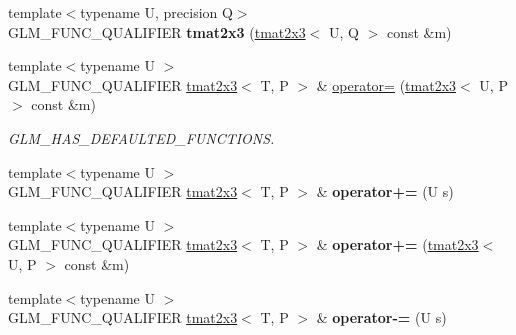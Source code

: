 \begin{DoxyCompactItemize}
\item 
\mbox{\label{structglm_1_1tmat2x3_a9a042a9919399f8eed6946601dbb79da}} 
{\footnotesize template$<$typename U, precision Q$>$ }\\G\+L\+M\+\_\+\+F\+U\+N\+C\+\_\+\+Q\+U\+A\+L\+I\+F\+I\+ER {\bfseries tmat2x3} (\hyperlink{structglm_1_1tmat2x3}{tmat2x3}$<$ U, Q $>$ const \&m)
\item 
\mbox{\label{structglm_1_1tmat2x3_a864869c76356750495b6d4172c8d84a3}} 
{\footnotesize template$<$typename U $>$ }\\G\+L\+M\+\_\+\+F\+U\+N\+C\+\_\+\+Q\+U\+A\+L\+I\+F\+I\+ER \hyperlink{structglm_1_1tmat2x3}{tmat2x3}$<$ T, P $>$ \& \hyperlink{structglm_1_1tmat2x3_a864869c76356750495b6d4172c8d84a3}{operator=} (\hyperlink{structglm_1_1tmat2x3}{tmat2x3}$<$ U, P $>$ const \&m)
\begin{DoxyCompactList}\small\item\em G\+L\+M\+\_\+\+H\+A\+S\+\_\+\+D\+E\+F\+A\+U\+L\+T\+E\+D\+\_\+\+F\+U\+N\+C\+T\+I\+O\+NS. \end{DoxyCompactList}\item 
\mbox{\label{structglm_1_1tmat2x3_a59f119877649405d4697179f9f281c0c}} 
{\footnotesize template$<$typename U $>$ }\\G\+L\+M\+\_\+\+F\+U\+N\+C\+\_\+\+Q\+U\+A\+L\+I\+F\+I\+ER \hyperlink{structglm_1_1tmat2x3}{tmat2x3}$<$ T, P $>$ \& {\bfseries operator+=} (U s)
\item 
\mbox{\label{structglm_1_1tmat2x3_aeedada1605cb25ac7e5e22b09c85df08}} 
{\footnotesize template$<$typename U $>$ }\\G\+L\+M\+\_\+\+F\+U\+N\+C\+\_\+\+Q\+U\+A\+L\+I\+F\+I\+ER \hyperlink{structglm_1_1tmat2x3}{tmat2x3}$<$ T, P $>$ \& {\bfseries operator+=} (\hyperlink{structglm_1_1tmat2x3}{tmat2x3}$<$ U, P $>$ const \&m)
\item 
\mbox{\label{structglm_1_1tmat2x3_ab20c10a9eacf4c5ba7c68b08d0421b76}} 
{\footnotesize template$<$typename U $>$ }\\G\+L\+M\+\_\+\+F\+U\+N\+C\+\_\+\+Q\+U\+A\+L\+I\+F\+I\+ER \hyperlink{structglm_1_1tmat2x3}{tmat2x3}$<$ T, P $>$ \& {\bfseries operator-\/=} (U s)
\item 
\mbox{\label{structglm_1_1tmat2x3_a7c726274f83d7577f62b165eafbb0510}} 

\end{DoxyCompactItemize}

